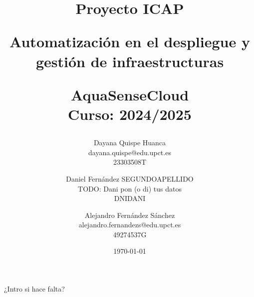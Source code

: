 \documentclass{article}
\title{
    \LARGE Proyecto ICAP \\

    \vspace{5mm}

    Automatización en el despliegue y gestión de infraestructuras \\

    \vspace{5mm}

    \large AquaSenseCloud \\
    \large Curso: 2024/2025
}
\author{
    Dayana Quispe Huanca\\
    dayana.quispe@edu.upct.es\\
    23303508T
    \and
    Daniel Fernández SEGUNDOAPELLIDO\\
    TODO: Dani pon (o di) tus datos\\
    DNIDANI
    \and
    Alejandro Fernández Sánchez\\
    alejandro.fernandezs@edu.upct.es\\
    49274537G
}\date{\today}
\begin{document}
\pagestyle{fancy}
\setlength{\headheight}{75pt}

\maketitle

\vspace{15mm}

\tableofcontents

\vspace{45mm}

¿Intro si hace falta?

\newpage

% 
\end{document}
